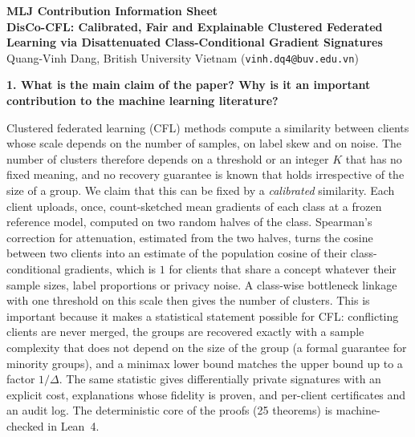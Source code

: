 \documentclass[10pt]{article}
\begin{document}
\begin{center}
{\large\bfseries MLJ Contribution Information Sheet}\\[2pt]
{\bfseries DisCo-CFL: Calibrated, Fair and Explainable Clustered Federated Learning via Disattenuated Class-Conditional Gradient Signatures}\\[2pt]
Quang-Vinh Dang, British University Vietnam (\texttt{vinh.dq4@buv.edu.vn})
\end{center}

\textbf{1. What is the main claim of the paper? Why is it an important contribution to the machine learning literature?}

Clustered federated learning (CFL) methods compute a similarity between clients whose scale depends on the number of samples, on label skew and on noise. The number of clusters therefore depends on a threshold or an integer $K$ that has no fixed meaning, and no recovery guarantee is known that holds irrespective of the size of a group. We claim that this can be fixed by a \emph{calibrated} similarity. Each client uploads, once, count-sketched mean gradients of each class at a frozen reference model, computed on two random halves of the class. Spearman's correction for attenuation, estimated from the two halves, turns the cosine between two clients into an estimate of the population cosine of their class-conditional gradients, which is $1$ for clients that share a concept whatever their sample sizes, label proportions or privacy noise. A class-wise bottleneck linkage with one threshold on this scale then gives the number of clusters. This is important because it makes a statistical statement possible for CFL: conflicting clients are never merged, the groups are recovered exactly with a sample complexity that does not depend on the size of the group (a formal guarantee for minority groups), and a minimax lower bound matches the upper bound up to a factor $1/\Delta$. The same statistic gives differentially private signatures with an explicit cost, explanations whose fidelity is proven, and per-client certificates and an audit log. The deterministic core of the proofs (25 theorems) is machine-checked in Lean~4.
\end{document}
